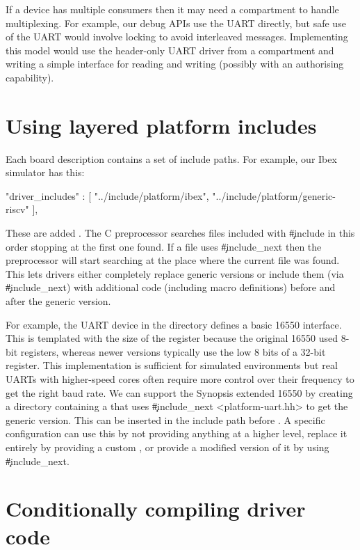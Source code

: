 If a device has multiple consumers then it may need a compartment to handle multiplexing.
For example, our debug APIs use the UART directly, but safe use of the UART would involve locking to avoid interleaved messages.
Implementing this model would use the header-only UART driver from a compartment and writing a simple interface for reading and writing (possibly with an authorising capability).

\section{Using layered platform includes}

Each board description contains a set of include paths.
For example, our Ibex simulator has this:

\begin{jsonsnippet}
    "driver_includes" : [
        "../include/platform/ibex",
        "../include/platform/generic-riscv"
    ],
\end{jsonsnippet}

These are added .
The C preprocessor searches files included with \c{#include} in this order stopping at the first one found.
If a file uses \c{#include_next} then the preprocessor will start searching at the place where the current file was found.
This lets drivers either completely replace generic versions or include them (via \c{#include_next}) with additional code (including macro definitions) before and after the generic version.

For example, the UART device in the  directory defines a basic 16550 interface.
This is templated with the size of the register because the original 16550 used 8-bit registers, whereas newer versions typically use the low 8 bits of a 32-bit register.
This implementation is sufficient for simulated environments but real UARTs with higher-speed cores often require more control over their frequency to get the right baud rate.
We can support the Synopsis extended 16550 by creating a  directory containing a  that uses \c{#include_next <platform-uart.hh>} to get the generic version.
This can be inserted in the include path before .
A specific configuration can use this by not providing anything at a higher level, replace it entirely by providing a custom , or provide a modified version of it by using \c{#include_next}.

\section{Conditionally compiling driver code}

